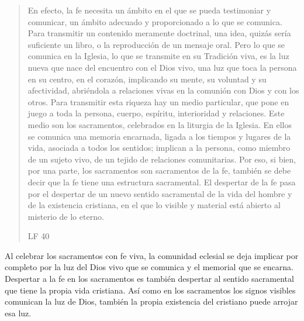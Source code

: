 \blockquote[LF 40]{En efecto, la fe necesita un ámbito en el que se pueda
  testimoniar y comunicar, un ámbito adecuado y proporcionado a lo que se
  comunica. Para transmitir un contenido meramente doctrinal, una idea, quizás
  sería suficiente un libro, o la reproducción de un mensaje oral. Pero lo que
  se comunica en la Iglesia, lo que se transmite en su Tradición viva, es la luz
  nueva que nace del encuentro con el Dios vivo, una luz que toca la persona en
  su centro, en el corazón, implicando su mente, su voluntad y su afectividad,
  abriéndola a relaciones vivas en la comunión con Dios y con los otros. Para
  transmitir esta riqueza hay un medio particular, que pone en juego a toda la
  persona, cuerpo, espíritu, interioridad y relaciones. Este medio son los
  sacramentos, celebrados en la liturgia de la Iglesia. En ellos se comunica una
  memoria encarnada, ligada a los tiempos y lugares de la vida, asociada a todos
  los sentidos; implican a la persona, como miembro de un sujeto vivo, de un
  tejido de relaciones comunitarias. Por eso, si bien, por una parte, los
  sacramentos son sacramentos de la fe, también se debe decir que la fe tiene
  una estructura sacramental. El despertar de la fe pasa por el despertar de un
  nuevo sentido sacramental de la vida del hombre y de la existencia cristiana,
  en el que lo visible y material está abierto al misterio de lo eterno.}.
Al celebrar los sacramentos con fe viva, la comunidad eclesial se deja implicar
por completo por la luz del Dios vivo que se comunica y el memorial que se
encarna. Despertar a la fe en los sacramentos es también despertar al sentido
sacramental que tiene la propia vida cristiana. Así como en los sacramentos los
signos visibles comunican la luz de Dios, también la propia existencia del
cristiano puede arrojar esa luz.

